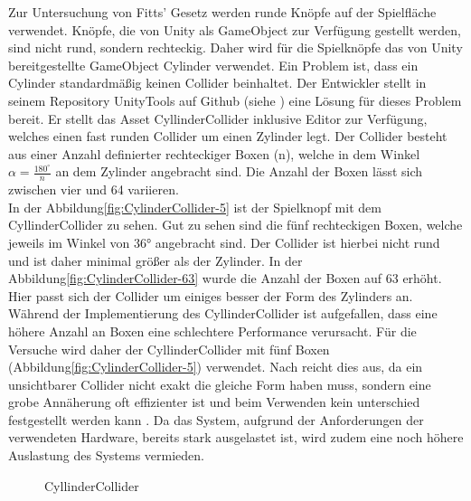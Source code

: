 Zur Untersuchung von Fitts' Gesetz werden runde Knöpfe auf der Spielfläche verwendet. Knöpfe, die von Unity als {\ttfamily GameObject} zur Verfügung gestellt werden, sind nicht rund, sondern rechteckig. Daher wird für die Spielknöpfe das von Unity bereitgestellte GameObject {\ttfamily Cylinder} verwendet. Ein Problem ist, dass ein {\ttfamily Cylinder} standardmäßig keinen Collider beinhaltet. Der Entwickler \citeauthor{kode80.2016} stellt in seinem Repository UnityTools auf Github (siehe \cite{kode80.2016}) eine Lösung für dieses Problem bereit. Er stellt das Asset {\ttfamily CyllinderCollider} inklusive Editor zur Verfügung, welches einen fast runden Collider um einen Zylinder legt. Der Collider besteht aus einer Anzahl definierter rechteckiger Boxen (n), welche in dem Winkel $\alpha = \frac{180^\circ}{n}$ an dem Zylinder angebracht sind. Die Anzahl der Boxen lässt sich zwischen vier und 64 variieren.\\
In der Abbildung\autoref{fig:CylinderCollider-5} ist der Spielknopf mit dem {\ttfamily CyllinderCollider} zu sehen. Gut zu sehen sind die fünf rechteckigen Boxen, welche jeweils im Winkel von 36° angebracht sind. Der Collider ist hierbei nicht rund und ist daher minimal größer als der Zylinder. In der Abbildung\autoref{fig:CylinderCollider-63} wurde die Anzahl der Boxen auf 63 erhöht. Hier passt sich der Collider um einiges besser der Form des Zylinders an. Während der Implementierung des {\ttfamily CyllinderCollider} ist aufgefallen, dass eine höhere Anzahl an Boxen eine schlechtere Performance verursacht. Für die Versuche wird daher der {\ttfamily CyllinderCollider} mit fünf Boxen (Abbildung\autoref{fig:CylinderCollider-5}) verwendet. Nach \citeauthor{Colliders.2020} reicht dies aus, da ein unsichtbarer Collider nicht exakt die gleiche Form haben muss, sondern eine grobe Annäherung oft effizienter ist und beim Verwenden kein unterschied festgestellt werden kann \cite{Colliders.2020}. Da das System, aufgrund der Anforderungen der verwendeten Hardware, bereits stark ausgelastet ist, wird zudem eine noch höhere Auslastung des Systems vermieden.

\begin{figure}[!htbp]
	\centering
	\qquad      
	\caption{CyllinderCollider}
	\label{fig:CylinderCollider}
\end{figure}  

